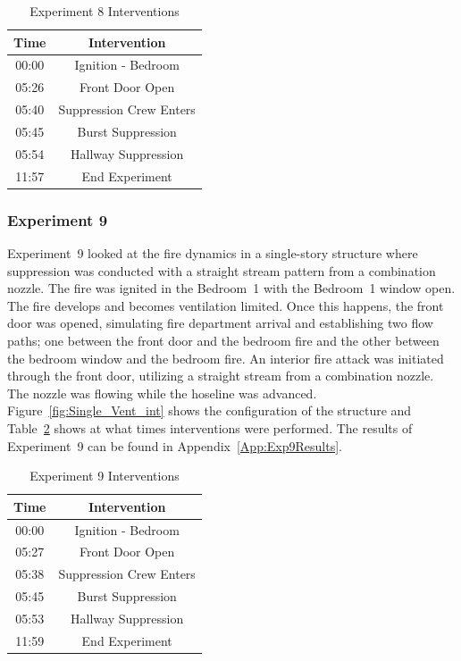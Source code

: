 \documentclass[12pt,oneside]{book}
\begin{document}

\begin{table}[H]
	\centering
	\caption{Experiment 8 Interventions}
	\begin{tabular}{|c|c|} 
		\hline
		Time & Intervention \\ \hline \hline
		00:00 & Ignition - Bedroom \\ \hline
		05:26 & Front Door Open \\ \hline
		05:40 & Suppression Crew Enters\\ \hline
		05:45 & Burst Suppression \\ \hline 
		05:54 & Hallway Suppression \\ \hline
		11:57 & End Experiment\\ \hline
	\end{tabular}
	\label{Table:Exp8Interventions}
\end{table}

\FloatBarrier

\subsubsection{Experiment 9}
Experiment~9 looked at the fire dynamics in a single-story structure where suppression was conducted with a straight stream pattern from a combination nozzle. The fire was ignited in the Bedroom~1 with the Bedroom~1 window open. The fire develops and becomes ventilation limited. Once this happens, the front door was opened, simulating fire department arrival and establishing two flow paths; one between the front door and the bedroom fire and the other between the bedroom window and the bedroom fire. An interior fire attack was initiated through the front door, utilizing a straight stream from a combination nozzle. The nozzle was flowing while the hoseline was advanced. Figure~\ref{fig:Single_Vent_int} shows the configuration of the structure and Table~\ref{Table:Exp9Interventions} shows at what times interventions were performed. The results of Experiment~9 can be found in Appendix~\ref{App:Exp9Results}. 


\begin{table}[H]
	\centering
	\caption{Experiment 9 Interventions}
	\begin{tabular}{|c|c|} 
		\hline
		Time & Intervention \\ \hline \hline
		00:00 & Ignition - Bedroom \\ \hline
		05:27 & Front Door Open \\ \hline
		05:38 & Suppression Crew Enters\\ \hline
		05:45 & Burst Suppression \\ \hline 
		05:53 & Hallway Suppression \\ \hline
		11:59 & End Experiment\\ \hline
	\end{tabular}
	\label{Table:Exp9Interventions}
\end{table}
\end{document}
